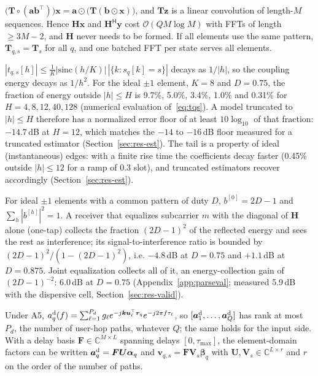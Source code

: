 \begin{corollary}\label{cor:fft}
$\big(\bm T\circ(\bm a\bm b^{\top})\big)\bm x=\bm a\odot\big(\bm T(\bm b\odot\bm x)\big)$, and
$\bm T\bm z$ is a linear convolution of length-$M$ sequences. Hence $\bm H\bm x$ and
$\bm H^{\mathsf H}\bm y$ cost $\mathcal O(QM\log M)$ with FFTs of length $\ge 3M-2$, and
$\bm H$ never needs to be formed. If all elements use the same pattern, $\bm T_{q,s}=\bm T_s$
for all $q$, and one batched FFT per state serves all elements.
\end{corollary}

\begin{corollary}\label{cor:tail}
$|t_{q,s}[h]|\le\frac1K|\mathrm{sinc}(h/K)|\,|\{k:s_q[k]=s\}|$ decays as $1/|h|$, so the
coupling energy decays as $1/h^2$. For the ideal $\pm1$ element, $K=8$ and $D=0.75$, the
fraction of energy outside $|h|\le H$ is 9.7\%, 5.0\%, 3.4\%, 1.0\% and 0.31\% for
$H=4,8,12,40,128$ (numerical evaluation of~\eqref{eq:tqs}). A model truncated to
$|h|\le H$ therefore has a normalized error floor of at least $10\log_{10}$ of that fraction:
$-14.7$\,dB at $H=12$, which matches the $-14$ to $-16$\,dB floor measured for a truncated
estimator (Section~\ref{sec:res-est}). The tail is a property of ideal (instantaneous) edges: with a finite rise time
the coefficients decay faster (0.45\% outside $|h|\le12$ for a ramp of 0.3 slot), and truncated estimators recover
accordingly (Section~\ref{sec:res-est}).
\end{corollary}

\begin{corollary}\label{cor:parseval}
For ideal $\pm1$ elements with a common pattern of duty $D$, $b^{[0]}=2D-1$ and
$\sum_h|b^{[h]}|^2=1$. A receiver that equalizes subcarrier $m$ with the diagonal of $\bm H$
alone (one-tap) collects the fraction $(2D-1)^2$ of the reflected energy and sees the rest
as interference; its signal-to-interference ratio is bounded by $(2D-1)^2/(1-(2D-1)^2)$, i.e.
$-4.8$\,dB at $D=0.75$ and $+1.1$\,dB at $D=0.875$. Joint equalization collects all of it,
an energy-collection gain of $(2D-1)^{-2}$: 6.0\,dB at $D=0.75$ (Appendix~\ref{app:parseval};
measured 5.9\,dB with the dispersive cell, Section~\ref{sec:res-valid}).
\end{corollary}

\begin{corollary}\label{cor:lowrank}
Under A5, $a^{\rm d}_q(f)=\sum_{\ell=1}^{P_d}g_\ell e^{-j\bm k\bm u_\ell^{\top}\bm r_q}e^{-j2\pi f\tau_\ell}$,
so $[\bm a^{\rm d}_1,\dots,\bm a^{\rm d}_Q]$ has rank at most $P_d$, the number of user-hop paths,
whatever $Q$; the same holds for the input side. With a delay basis $\bm F\in\mathbb C^{M\times L}$
spanning delays $[0,\tau_{\max}]$, the element-domain factors can be written
$\bm a^{\rm d}_q=\bm F\bm U\bm\alpha_q$ and $\bm v_{q,s}=\bm F\bm V_s\bm\beta_q$ with
$\bm U,\bm V_s\in\mathbb C^{L\times r}$ and $r$ on the order of the number of paths.
\end{corollary}

